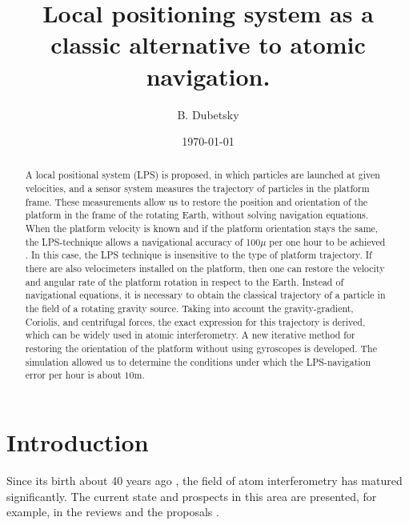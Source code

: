 \documentclass[twocolumn,showpacs,preprintnumbers]{revtex4}
\begin{document}
\title{Local positioning system as a classic alternative to atomic
navigation.}
\author{B. Dubetsky}
\date{\today }

\begin{abstract}
A local positional system (LPS) is proposed, in which particles are launched
at given velocities, and a sensor system measures the trajectory of
particles in the platform frame. These measurements allow us to restore the
position and orientation of the platform in the frame of the rotating Earth,
without solving navigation equations. When the platform velocity is known
and if the platform orientation stays the same, the LPS-technique allows a
navigational accuracy of 100$\mu $ per one hour to be achieved . In this
case, the LPS technique is insensitive to the type of platform trajectory.
If there are also velocimeters installed on the platform, then one can
restore the velocity and angular rate of the platform rotation in respect to
the Earth. Instead of navigational equations, it is necessary to obtain the
classical trajectory of a particle in the field of a rotating gravity
source. Taking into account the gravity-gradient, Coriolis, and centrifugal
forces, the exact expression for this trajectory is derived, which can be
widely used in atomic interferometry. A new iterative method for restoring
the orientation of the platform without using gyroscopes is developed. The
simulation allowed us to determine the conditions under which the
LPS-navigation error per hour is about $10$m.
\end{abstract}

\maketitle

\twocolumngrid%

\section{\label{s1}Introduction}

Since its birth about 40 years ago \cite{c1}, the field of atom
interferometry has matured significantly. The current state and prospects in
this area are presented, for example, in the reviews \cite{c1.1} and the
proposals \cite{c1.2,c1.3,c1.4,c1.5,c1.5.1,c1.5.2}.
\end{document}
